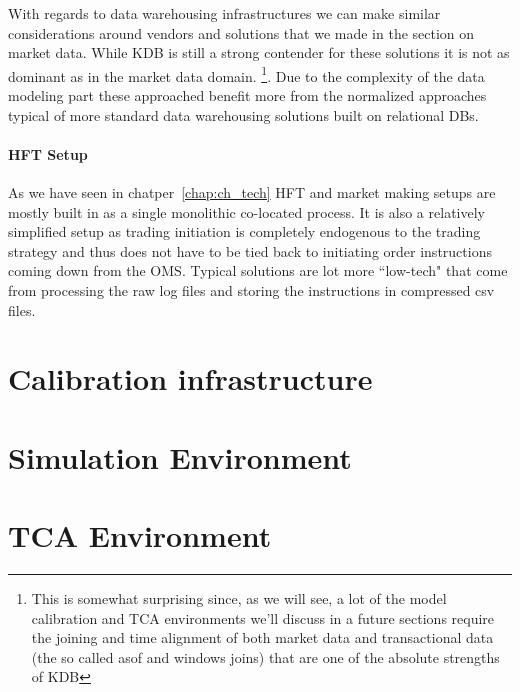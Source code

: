 With regards to data warehousing infrastructures we can make similar considerations around vendors and solutions that we made in the section on market data. While KDB is still a strong contender for these solutions it is not as dominant as in the market data domain. \footnote{This is somewhat surprising since, as we will see, a lot of the model calibration and TCA environments we'll discuss in a future sections require the joining and time alignment of both market data and transactional data (the so called asof and windows joins) that are one of the absolute strengths of KDB}. Due to the  complexity of the data modeling part these approached benefit more from the normalized approaches typical of more standard data warehousing solutions built on relational DBs. 

\paragraph{HFT Setup}
As we have seen in chatper~\ref{chap:ch_tech} HFT and market making setups are mostly built in as a single monolithic co-located process. It is also a relatively simplified setup as trading initiation is completely endogenous to the trading strategy and thus does not have to be tied back to initiating order instructions coming down from the OMS. Typical solutions are  lot more ``low-tech" that come from processing the raw log files and storing the instructions in compressed csv files.

\section{Calibration infrastructure}
\section{Simulation Environment}
\section{TCA Environment}

